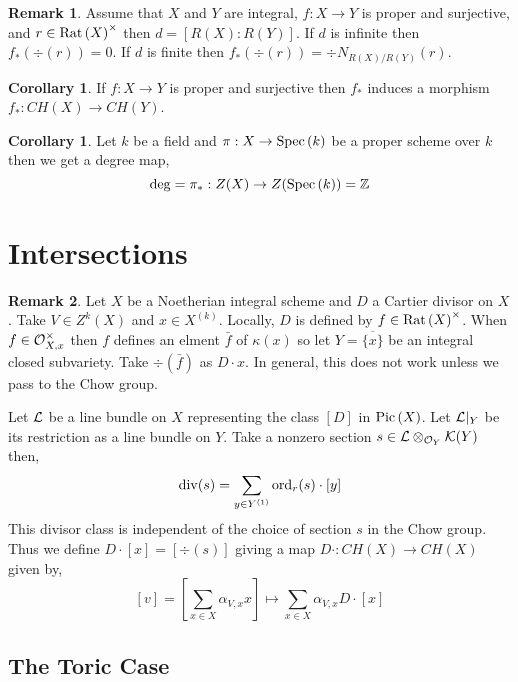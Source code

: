 \documentclass[12pt]{extarticle}
\newcommand{\Z}{\mathbb{Z}}
\theoremstyle{definition}
\newtheorem{corollary}[theorem]{Corollary}
\newtheorem{remark}{Remark}
\newenvironment{definition}[1][Definition:]{\begin{trivlist}
\item[\hskip \labelsep {\bfseries #1}]}{\end{trivlist}}
\begin{document}
\begin{remark}
Assume that $X$ and $Y$ are integral, $f : X \to Y$ is proper and surjective, and $r \in \mathrm{Rat} \left( X \right)^\times$ then $d = [ R(X) : R(Y) ]$. If $d$ is infinite then $f_*(\div(r)) = 0$. If $d$ is finite then $f_*(\div(r)) = \div{N_{R(X) / R(Y)} (r)}$. 
\end{remark}

\begin{corollary}
If $f : X \to Y$ is proper and surjective then $f_*$ induces a morphism $f_* : CH(X) \to CH(Y)$. 
\end{corollary}

\begin{corollary}
Let $k$ be a field and $\pi : X \to \mathrm{Spec}\left( k \right)$ be a proper scheme over $k$ then we get a degree map,
\[ \deg = \pi_* : Z(X) \to Z(\Spec{k}) = \Z \]
\end{corollary}

\section{Intersections}

\begin{remark}
Let $X$ be a Noetherian integral scheme and $D$ a Cartier divisor on $X$. Take $V \in Z^k(X)$ and $x \in X^{(k)}$. Locally, $D$ is defined by $f \in \mathrm{Rat} \left( X \right)^\times$. When $f \in \mathcal{O}_{X, x}^\times$ then $f$ defines an elment $\bar{f}$ of $\kappa(x)$ so let $Y = \overline{\{ x \}}$ be an integral closed subvariety. Take $\div(\bar{f})$ as $D \cdot x$. In general, this does not work unless we pass to the Chow group. 
\end{remark}

\begin{definition}
Let $\mathcal{L}$ be a line bundle on $X$ representing the class $[D]$ in $\mathrm{Pic}\left( X \right)$. Let $\mathcal{L}|_Y$ be its restriction as a line bundle on $Y$. Take a nonzero section $s \in \mathcal{L} \otimes_{\mathcal{O}_{Y}} \mathcal{K}(Y)$ then,
\[ \mathrm{div}{(s)} = \sum_{y \in Y^{(1)}} \mathrm{ord}_r(s) \cdot [y] \]
This divisor class is independent of the choice of section $s$ in the Chow group. Thus we define $D \cdot [x] = [\div{(s)}]$ giving a map $D \cdot : CH(X) \to CH(X)$ given by,
\[ [v] = \left[ \sum_{x \in X} \alpha_{V, x} x \right] \mapsto \sum_{x \in X} \alpha_{V, x} D \cdot [x] \]
\end{definition}

\subsection{The Toric Case}
\end{document}
